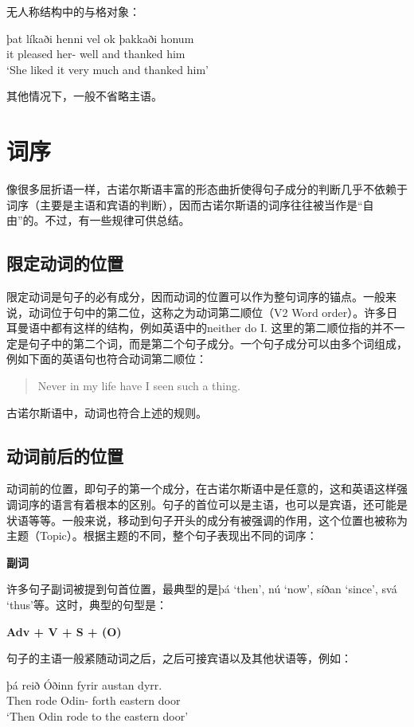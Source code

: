\begin{enumerate}
          无人称结构中的与格对象：
          \begin{exe}
              \ex \gll þat	líkaði	henni	vel	ok	þakkaði	honum\\
              it	pleased	her-{\dat}	well	and	thanked	him\\
              \trans `She liked it very much and thanked him’
          \end{exe}

          其他情况下，一般不省略主语。

\end{enumerate}

\section{词序}
像很多屈折语一样，古诺尔斯语丰富的形态曲折使得句子成分的判断几乎不依赖于词序（主要是主语和宾语的判断），因而古诺尔斯语的词序往往被当作是“自由”的。不过，有一些规律可供总结。

\subsection{限定动词的位置}
限定动词是句子的必有成分，因而动词的位置可以作为整句词序的锚点。一般来说，动词位于句中的第二位，这称之为动词第二顺位（V2 Word order）。许多日耳曼语中都有这样的结构，例如英语中的neither do I. 这里的第二顺位指的并不一定是句子中的第二个词，而是第二个句子成分。一个句子成分可以由多个词组成，例如下面的英语句也符合动词第二顺位：
\begin{quote}
    Never in my life have I seen such a thing.
\end{quote}
古诺尔斯语中，动词也符合上述的规则。
\subsection{动词前后的位置}
动词前的位置，即句子的第一个成分，在古诺尔斯语中是任意的，这和英语这样强调词序的语言有着根本的区别。句子的首位可以是主语，也可以是宾语，还可能是状语等等。一般来说，移动到句子开头的成分有被强调的作用，这个位置也被称为主题（Topic）。根据主题的不同，整个句子表现出不同的词序：

\textbf{副词}

许多句子副词被提到句首位置，最典型的是þá `then’, nú `now’, síðan `since’, svá `thus’等。这时，典型的句型是：
\begin{center}
    \textbf{Adv + V + S + (O)}
\end{center}

句子的主语一般紧随动词之后，之后可接宾语以及其他状语等，例如：
\begin{exe}
    \ex \gll
    þá	reið	Óðinn	fyrir	austan	dyrr.\\
    Then	rode	Odin-{\nom}	forth	eastern	door\\
    \trans `Then Odin rode to the eastern door’
\end{exe}

